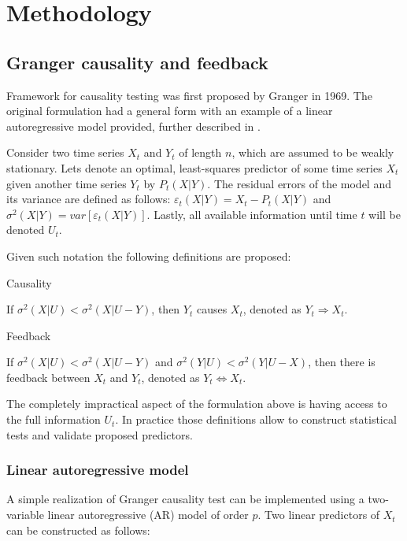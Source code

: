 \section{Methodology} \label{sec:methodology}

\subsection{Granger causality and feedback} \label{sec:granger-causality}
Framework for causality testing was first proposed by Granger \cite{granger69} in 1969.
The original formulation had a general form with an example of a linear autoregressive model provided, further described in .

Consider two time series $X_t$ and $Y_t$ of length $n$, which are assumed to be weakly stationary.
Lets denote an optimal, least-squares predictor of some time series $X_t$ given another time series $Y_t$ by $P_t(X|Y)$.
The residual errors of the model and its variance are defined as follows: 
$\varepsilon_t(X|Y) = X_t - P_t(X|Y)$ and $\sigma^2(X|Y) = var[\varepsilon_t(X|Y)]$.
Lastly, all available information until time $t$ will be denoted $U_t$.

Given such notation the following definitions are proposed:

\begin{definition} \label{def:causality}
	Causality

	If $\sigma^2(X|U) < \sigma^2(X|U-Y)$, then $Y_t$ causes $X_t$, denoted as $Y_t \Rightarrow X_t$.
\end{definition}

\begin{definition}
	Feedback

	If $\sigma^2(X|U) < \sigma^2(X|U-Y)$ and $\sigma^2(Y|U) < \sigma^2(Y|U-X)$, then there is feedback between $X_t$ and $Y_t$, denoted as $Y_t \Leftrightarrow X_t$.
\end{definition}

The completely impractical aspect of the formulation above is having access to the full information $U_t$.
In practice those definitions allow to construct statistical tests and validate proposed predictors.

\subsubsection{Linear autoregressive model} \label{sec:linear-ar}
A simple realization of Granger causality test can be implemented using a two-variable linear autoregressive (AR) model of order $p$.
Two linear predictors of $X_t$ can be constructed as follows:

